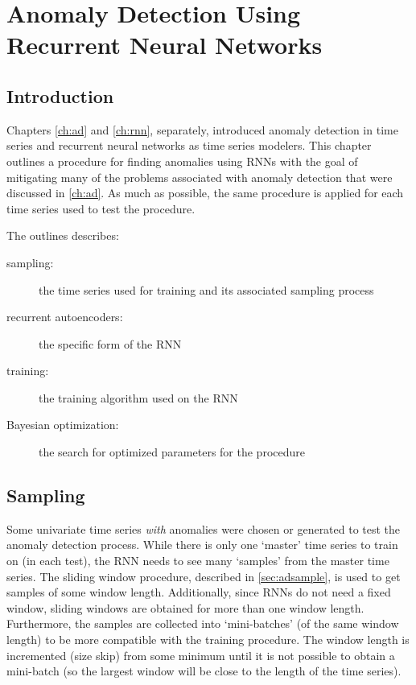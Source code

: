 \chapter[]{Anomaly Detection Using Recurrent Neural Networks}


\section{Introduction}

Chapters \ref{ch:ad} and \ref{ch:rnn}, separately, introduced anomaly detection in time series and recurrent neural networks as time series modelers.
%
This chapter outlines a procedure for finding anomalies using RNNs with the goal of mitigating many of the problems associated with anomaly detection that were discussed in \ref{ch:ad}.
%
As much as possible, the same procedure is applied for each time series used to test the procedure.


The outlines describes:
%
\begin{description}
%
\item[sampling:] the time series used for training and its associated sampling process
%
\item[recurrent autoencoders:] the specific form of the RNN
%
\item[training:] the training algorithm used on the RNN
%
\item[Bayesian optimization:] the search for optimized parameters for the procedure
%
\end{description}



\section{Sampling}
\label{sec:sampling}

Some univariate time series \emph{with} anomalies were chosen or generated to test the anomaly detection process.
%
While there is only one `master' time series to train on (in each test), the RNN needs to see many `samples' from the master time series.
%
The sliding window procedure, described in \ref{sec:adsample}, is used to get samples of some window length.
%
Additionally, since RNNs do not need a fixed window, sliding windows are obtained for more than one window length.
%
Furthermore, the samples are collected into `mini-batches' (of the same window length) to be more compatible with the training procedure.
%
The window length is incremented (size skip) from some minimum until it is not possible to obtain a mini-batch (so the largest window will be close to the length of the time series).


